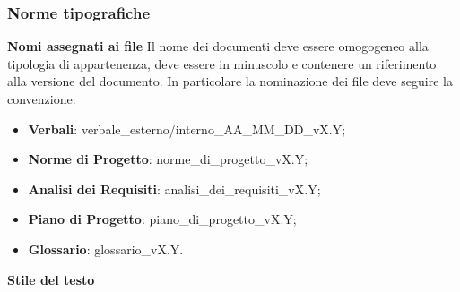 \subsubsection{Norme tipografiche}
\textbf{Nomi assegnati ai file} Il nome dei documenti deve essere omogogeneo alla tipologia di appartenenza, deve essere in minuscolo
e contenere un riferimento alla versione del documento. In particolare la nominazione dei file deve seguire la convenzione:
\begin{itemize}
    \item \textbf{Verbali}: verbale\_esterno/interno\_AA\_MM\_DD\_vX.Y;
    \item \textbf{Norme di Progetto}: norme\_di\_progetto\_vX.Y;
    \item \textbf{Analisi dei Requisiti}: analisi\_dei\_requisiti\_vX.Y;
    \item \textbf{Piano di Progetto}: piano\_di\_progetto\_vX.Y;
    \item \textbf{Glossario}: glossario\_vX.Y.
\end{itemize}
\textbf{Stile del testo}
